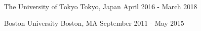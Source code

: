 %
%
%

\vspace*{0.4cm}

\begin{cventries}

    {The University of Tokyo}
    {Tokyo, Japan}
    {April 2016 - March 2018}
    {}

    {Boston University}
    {Boston, MA}
    {September 2011 - May 2015}
    {}

\vspace*{-0.7cm}
\end{cventries}
